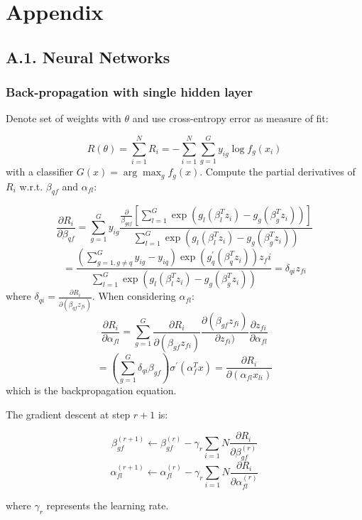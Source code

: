 \documentclass[12pt,]{article}
\title{}
\author{}
\date{}
\begin{document}
\hypertarget{appendix}{%
\section{Appendix}\label{appendix}}

\hypertarget{a.1.-neural-networks}{%
\subsection{A.1. Neural Networks}\label{a.1.-neural-networks}}

\hypertarget{back-propagation-with-single-hidden-layer}{%
\subsubsection{Back-propagation with single hidden
layer}\label{back-propagation-with-single-hidden-layer}}

Denote set of weights with \(\theta\) and use cross-entropy error as
measure of fit:

\[R(\theta)=\sum_{i=1}^{N}R_i =-\sum_{i=1}^{N}\sum_{g=1}^{G}y_{ig}\log{f_g(x_i)}\]
with a classifier \(G(x)=\arg\max_{g}f_g(x)\). Compute the partial
derivatives of \(R_i\) w.r.t. \(\beta_{qf}\) and \(\alpha_{fl}\):

\[\frac{\partial R_i}{\partial \beta_{qf}}=\sum_{g=1}^{G}y_{ig}\frac{\frac{\partial}{\beta_{gqf}}[\sum_{l=1}^{G}\exp(g_l(\beta_{l}^{T}z_i)-g_g(\beta_{g}^{T}z_i))]}{\sum_{l=1}^{G}\exp(g_l(\beta_{l}^{T}z_i)-g_g(\beta_{g}^{T}z_i))}\]
\[=\frac{(\sum_{g=1,g\neq q}^{G}y_{ig}-y_{iq})\exp(g_{q}^{'}(\beta_q^Tz_i))z_fi}{\sum_{l=1}^{G}\exp(g_l(\beta_{l}^{T}z_i)-g_g(\beta_{g}^{T}z_i))}=\delta_{qi}z_{fi}\]
where \(\delta_{qi}=\frac{\partial R_i}{\partial (\beta_{qf} z_{fi})}\).
When considering \(\alpha_{fl}\):
\[\frac{\partial R_i}{\partial \alpha_{fl}}=\sum_{g=1}^{G}\frac{\partial R_i}{\partial (\beta_{gf}z_{fi})}\frac{\partial (\beta_{gf}z_{fi})}{\partial z_{fi})}\frac{\partial z_{fi}}{\partial \alpha_{fl}}\]
\[= (\sum_{g=1}^{G}\delta_{qi}\beta_{gf})\sigma^{'}(\alpha_{f}^{T}x)=\frac{\partial R_i}{\partial (\alpha_{fl}x_{li})}\]
which is the backpropagation equation.

The gradient descent at step \(r+1\) is:

\[\beta_{gf}^{(r+1)}\leftarrow\beta_{gf}^{(r)}-\gamma_r\sum_{i=1}{N}\frac{\partial R_i}{\partial \beta_{gf}^{(r)}}\]
\[\alpha_{fl}^{(r+1)}\leftarrow\alpha_{fl}^{(r)}-\gamma_r\sum_{i=1}{N}\frac{\partial R_i}{\partial \alpha_{fl}^{(r)}}\]

where \(\gamma_r\) represents the learning rate.
\end{document}
